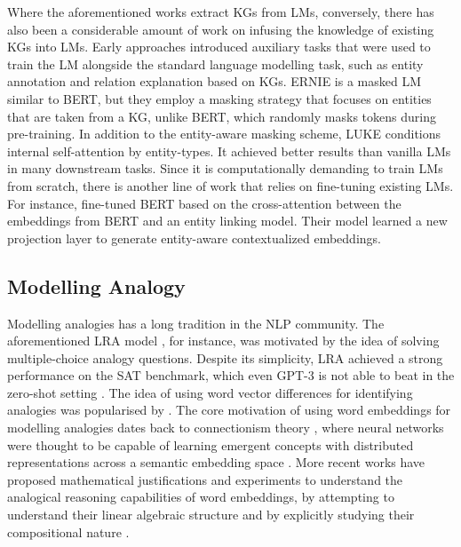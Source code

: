 \documentclass[3p]{elsarticle}
\begin{document}
{Where the aforementioned works extract KGs from LMs, conversely, there has also been a considerable amount of work on infusing the knowledge of existing KGs into LMs. Early approaches introduced auxiliary tasks that were used to train the LM alongside the standard language modelling task, such as entity annotation \cite{logan-etal-2019-baracks} and relation explanation \cite{hayashi2020latent} based on KGs. ERNIE \cite{sun2019ernie} is a masked LM similar to BERT, but they employ a masking strategy that focuses on entities that are taken from a KG, unlike BERT, which randomly masks tokens during pre-training. In addition to the entity-aware masking scheme, LUKE \cite{yamada-etal-2020-luke} conditions internal self-attention by entity-types. It achieved better results than vanilla LMs in many downstream tasks. Since it is computationally demanding to train LMs from scratch, there is another line of work that relies on fine-tuning existing LMs. For instance, \cite{peters-etal-2019-knowledge} fine-tuned BERT based on the cross-attention between the embeddings from BERT and an entity linking model. Their model learned a new projection layer to generate entity-aware contextualized embeddings. 

\subsection{Modelling Analogy}
Modelling analogies has a long tradition in the NLP community. The aforementioned LRA model \cite{Turney:2005:MSS:1642293.1642475}, for instance, was motivated by the idea of solving multiple-choice analogy questions. Despite its simplicity, LRA achieved a strong performance on the SAT benchmark, which even GPT-3 is not able to beat in the zero-shot setting \cite{GPT3}.
The idea of using word vector differences for identifying analogies was popularised by \cite{mikolov2013distributed}. The core motivation of using word embeddings for modelling analogies dates back to connectionism theory \cite{feldman1982connectionist}, where neural networks were thought to be capable of learning emergent concepts \cite{hopfield1982neural, hinton1986learning} with distributed representations across a semantic embedding space \cite{hinton1986distributed}. More recent works have proposed mathematical justifications and experiments to understand the analogical reasoning capabilities of word embeddings, by attempting to understand their linear algebraic structure \cite{arora2016latent,gittens2017skip,allen2019analogies} and by explicitly studying their compositional nature \cite{levy2014linguistic,paperno2016whole,ethayarajh2019towards,chiang-etal-2020-understanding}. 

}
\end{document}
